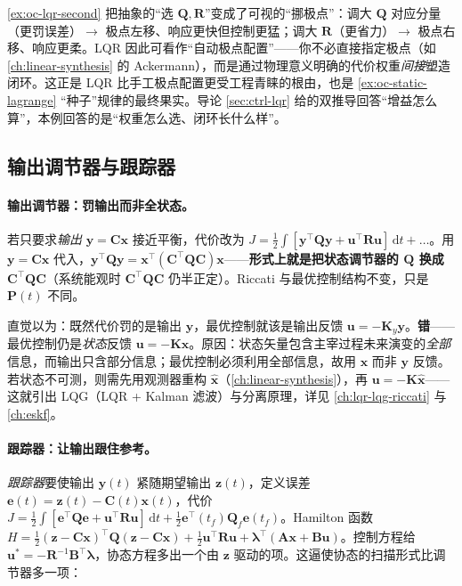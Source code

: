 \begin{insight}
\cref{ex:oc-lqr-second} 把抽象的“选 $\mathbf Q,\mathbf R$”变成了可视的“挪极点”：调大 $\mathbf Q$ 对应分量（更罚误差）$\to$ 极点左移、响应更快但控制更猛；调大 $\mathbf R$（更省力）$\to$ 极点右移、响应更柔。LQR 因此可看作“自动极点配置”——你不必直接指定极点（如 \cref{ch:linear-synthesis} 的 Ackermann），而是通过物理意义明确的代价权重\emph{间接}塑造闭环。这正是 LQR 比手工极点配置更受工程青睐的根由，也是 \cref{ex:oc-static-lagrange} “种子”规律的最终果实。导论 \cref{sec:ctrl-lqr} 给的双推导回答“增益怎么算”，本例回答的是“权重怎么选、闭环长什么样”。
\end{insight}

\subsection{输出调节器与跟踪器}
\label{sec:oc-tracker}

\paragraph{输出调节器：罚输出而非全状态。}
若只要求\emph{输出} $\mathbf y=\mathbf C\mathbf x$ 接近平衡，代价改为 $J=\tfrac12\int[\mathbf y^\top\mathbf Q\mathbf y+\mathbf u^\top\mathbf R\mathbf u]\,\mathrm dt+\dots$。用 $\mathbf y=\mathbf C\mathbf x$ 代入，$\mathbf y^\top\mathbf Q\mathbf y=\mathbf x^\top(\mathbf C^\top\mathbf Q\mathbf C)\mathbf x$——\textbf{形式上就是把状态调节器的 $\mathbf Q$ 换成 $\mathbf C^\top\mathbf Q\mathbf C$}（系统能观时 $\mathbf C^\top\mathbf Q\mathbf C$ 仍半正定）。Riccati 与最优控制结构不变，只是 $\mathbf P(t)$ 不同。

\begin{pitfall}[“罚输出就该用输出反馈”]
直觉以为：既然代价罚的是输出 $\mathbf y$，最优控制就该是输出反馈 $\mathbf u=-\mathbf K_y\mathbf y$。\textbf{错}——最优控制仍是\emph{状态}反馈 $\mathbf u=-\mathbf K\mathbf x$。原因：状态矢量包含主宰过程未来演变的\emph{全部}信息，而输出只含部分信息；最优控制必须利用全部信息，故用 $\mathbf x$ 而非 $\mathbf y$ 反馈\cite{liubao2006modern}。若状态不可测，则需先用观测器重构 $\hat{\mathbf x}$（\cref{ch:linear-synthesis}），再 $\mathbf u=-\mathbf K\hat{\mathbf x}$——这就引出 LQG（LQR + Kalman 滤波）与分离原理，详见 \cref{ch:lqr-lqg-riccati} 与 \cref{ch:eskf}。
\end{pitfall}

\paragraph{跟踪器：让输出跟住参考。}
\emph{跟踪器}要使输出 $\mathbf y(t)$ 紧随期望输出 $\mathbf z(t)$，定义误差 $\mathbf e(t)=\mathbf z(t)-\mathbf C(t)\mathbf x(t)$，代价 $J=\tfrac12\int[\mathbf e^\top\mathbf Q\mathbf e+\mathbf u^\top\mathbf R\mathbf u]\,\mathrm dt+\tfrac12\mathbf e^\top(t_f)\mathbf Q_f\mathbf e(t_f)$。Hamilton 函数 $H=\tfrac12(\mathbf z-\mathbf C\mathbf x)^\top\mathbf Q(\mathbf z-\mathbf C\mathbf x)+\tfrac12\mathbf u^\top\mathbf R\mathbf u+\boldsymbol\lambda^\top(\mathbf A\mathbf x+\mathbf B\mathbf u)$。控制方程给 $\mathbf u^*=-\mathbf R^{-1}\mathbf B^\top\boldsymbol\lambda$，协态方程多出一个由 $\mathbf z$ 驱动的项。这逼使协态的扫描形式比调节器多一项：

